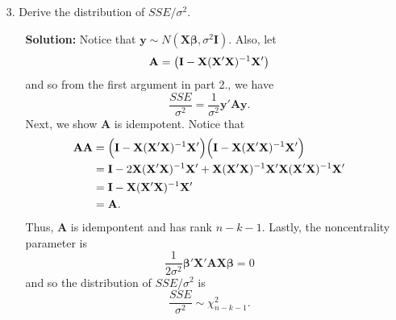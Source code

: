 \documentclass[11pt]{article}
\begin{document}
\begin{itemize}
\item[3.] Derive the distribution of $SSE/\sigma^2$.
\begin{itemize}
\item[] \textbf{Solution:}  Notice that $\mathbf{y} \sim N(\mathbf{X}\bm\beta,\sigma^2\mathbf{I})$.  Also, let
\[
\mathbf{A} = \big{(}\mathbf{I} - \mathbf{X}(\mathbf{X}'\mathbf{X})^{-1}\mathbf{X}'\big{)}
\]
and so from the first argument in part 2., we have
\[
\frac{SSE}{\sigma^2} = \frac{1}{\sigma^2}\mathbf{y}'\mathbf{A}\mathbf{y}.
\]
Next, we show $\mathbf{A}$ is idempotent.  Notice that
\begin{align*}
\mathbf{A}\mathbf{A} &= \Big{(}\mathbf{I} - \mathbf{X}(\mathbf{X}'\mathbf{X})^{-1}\mathbf{X}'\Big{)}\Big{(}\mathbf{I} - \mathbf{X}(\mathbf{X}'\mathbf{X})^{-1}\mathbf{X}'\Big{)} \\
&= \mathbf{I} - 2\mathbf{X}(\mathbf{X}'\mathbf{X})^{-1}\mathbf{X}' + \mathbf{X}(\mathbf{X}'\mathbf{X})^{-1}\mathbf{X}'\mathbf{X}(\mathbf{X}'\mathbf{X})^{-1}\mathbf{X}' \\
&= \mathbf{I} - \mathbf{X}(\mathbf{X}'\mathbf{X})^{-1}\mathbf{X}' \\
&= \mathbf{A}.
\end{align*}
Thus, $\mathbf{A}$ is idempontent and has rank $n-k-1$.  Lastly, the noncentrality parameter is
\[
\frac{1}{2\sigma^2}\bm\beta'\mathbf{X}'\mathbf{A}\mathbf{X}\bm\beta = 0
\]
and so the distribution of $SSE/\sigma^2$ is
\[
\frac{SSE}{\sigma^2} \sim \chi^2_{n-k-1}.
\]
\end{itemize}


\end{itemize}
\end{document}

